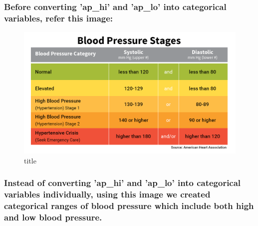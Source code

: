 \documentclass[11pt]{article}
\makeatletter
\def\maxwidth{\ifdim\Gin@nat@width>\linewidth\linewidth
    \else\Gin@nat@width\fi}
\let\Oldincludegraphics\includegraphics
\renewcommand{\includegraphics}[1]{\Oldincludegraphics[width=.8\maxwidth]{#1}}
\makeatother
\begin{document}
    \subsubsection{Before converting 'ap\_hi' and 'ap\_lo' into categorical
variables, refer this
image:}\label{before-converting-ap_hi-and-ap_lo-into-categorical-variables-refer-this-image}

\begin{figure}
\centering
\includegraphics{basic_blood_pressure_chart.png}
\caption{title}
\end{figure}

\subsubsection{Instead of converting 'ap\_hi' and 'ap\_lo' into
categorical variables individually, using this image we created
categorical ranges of blood pressure which include both high and low
blood
pressure.}\label{instead-of-converting-ap_hi-and-ap_lo-into-categorical-variables-individually-using-this-image-we-created-categorical-ranges-of-blood-pressure-which-include-both-high-and-low-blood-pressure.}
\end{document}
